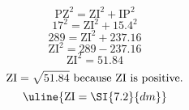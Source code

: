 \[\text{PZ}^{2}=\text{ZI}^{2}+\text{IP}^{2}\]
\[17^{2}=\text{ZI}^{2}+15.4^{2}\]
\[289=\text{ZI}^{2}+237.16\]
\[\text{ZI}^{2}=289-237.16\]
\[\text{ZI}^{2}=51.84\]
\[\text{ZI}=\sqrt{\mathstrut 51.84}\text{ because ZI is positive.}\]
\[\uline{\text{ZI}=\SI{7.2}{dm}}\]
